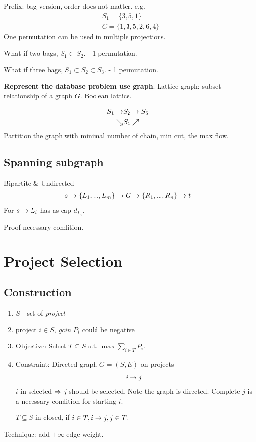 \documentclass[a4paper]{report}
\theoremstyle{definition}
\begin{document}
Prefix: bag version, order does not matter. e.g.
\begin{align*}
& S_1 = \{3, 5, 1\} \\
& C= \{1, 3,5, 2, 6, 4\}
\end{align*}
One permutation can be used in multiple projections.

What if two bags, $S_1 \subset S_2$. - 1 permutation.

What if three bags, $S_1 \subset S_2 \subset S_3$. - 1 permutation.

\textbf{Represent the database problem use graph}. Lattice graph: subset relationship of a graph $G$. Boolean lattice.

\begin{align*}
S_1 \rightarrow & S_2 \rightarrow S_5\\
\searrow & S_4 \nearrow
\end{align*}
Partition the graph with minimal number of chain, min cut, the max flow.
\subsection{Spanning subgraph}
Bipartite \& Undirected
\begin{align*}
s \rightarrow \{L_1, ..., L_m\} \rightarrow G \rightarrow \{R_1, ..., R_n\} \rightarrow t
\end{align*}
For $s \rightarrow L_i$ has as cap $d_{L_i}$.

Proof necessary condition.

\section{Project Selection}
\subsection{Construction}
\begin{enumerate}
\item $S$ - set of \textit{project}
\item project $i\in S$, \textit{gain} $P_i$ could be negative
\item Objective: Select $T\subseteq S$ s.t. $\max \sum_{i\in T} P_i$.
\item Constraint: Directed graph $G=(S, E)$ on projects
$$
i \rightarrow j
$$
$i$ in selected $\Rightarrow$ $j$ should be selected. Note the graph is directed. Complete $j$ is a necessary condition for starting $i$.

$T\subseteq S$ in closed, if $i\in T, i\rightarrow j, j \in T$.
\end{enumerate}
Technique: add $+\infty$ edge weight.
\end{document}
